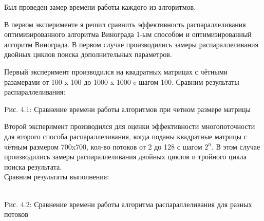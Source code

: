 \documentclass[12pt]{report}
\begin{document}
Был проведен замер времени работы каждого из алгоритмов.

В первом эксперименте я решил сравнить эффективность распараллеливания оптимизированного алгоритма Винограда 1-ым способом и оптимизированный алгоритм Винограда.
В первом случае производились замеры распараллеливания двойных циклов поиска дополнительных параметров.

Первый эксперимент производился на квадратных матрицах с чётными разамерами от 100 x 100 до 1000 x 1000 c шагом 100.
Сравним результаты распараллеливания:

\begin{center}
Pис. 4.1: Сравнение времени работы алгоритмов при четном размере матрицы
\end{center}

Второй эксперимент производился для оценки эффективности многопоточности для второго способа распараллеливания, когда поданы квадратные матрицы с чётным размером 700x700, кол-во потоков от 2 до 128 с шагом ${2^n}$. В этом случае производились замеры распараллеливания двойных циклов и тройного цикла поиска результата.\\
Сравним результаты выполнения:\\
\\
\begin{center}
Pис. 4.2: Сравнение времени работы алгоритма распараллеливания для разных потоков
\end{center}
\end{document}
